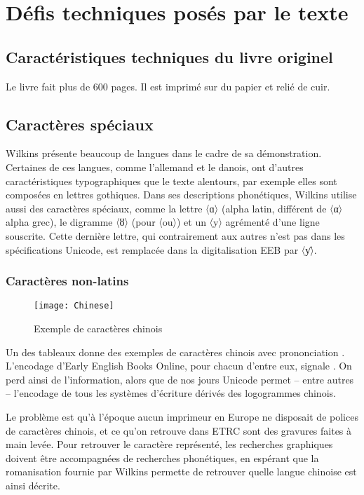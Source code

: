 \chapter{Défis techniques posés par le texte}\label{Défis}
\section{Caractéristiques techniques du livre originel}\label{DéfisTech}
Le livre fait plus de 600 pages.
Il est imprimé sur du papier et relié de cuir.

\section{Caractères spéciaux}\label{DéfisCar}
Wilkins présente beaucoup de langues dans le cadre de sa démonstration.
Certaines de ces langues, comme l'allemand et le danois, ont d'autres caractéristiques typographiques que le texte alentours, par exemple elles sont composées en lettres gothiques.
Dans ses descriptions phonétiques, Wilkins utilise aussi des caractères spéciaux, comme la lettre 〈ɑ〉 (alpha latin, différent de 〈α〉 alpha grec), le digramme 〈ȣ〉 (pour 〈ou〉) et un 〈y〉 agrémenté d'une ligne souscrite.
Cette dernière lettre, qui contrairement aux autres n'est pas dans les spécifications Unicode, est remplacée dans la digitalisation EEB par 〈ƴ〉.
\subsection{Caractères non-latins}
\begin{figure}[h]
   \caption{\label{Chinese} Exemple de caractères chinois}
   \texttt{[image: Chinese]}
\end{figure}
Un des tableaux donne des exemples de caractères chinois avec prononciation \parencite[p. 451]{wilkins_essay_1668}.
L'encodage d'Early English Books Online, pour chacun d'entre eux, signale .
On perd ainsi de l'information, alors que de nos jours Unicode permet -- entre autres -- l'encodage de tous les systèmes d'écriture dérivés des logogrammes chinois.

Le problème est qu'à l'époque aucun imprimeur en Europe ne disposait de polices de caractères chinois, et ce qu'on retrouve dans ETRC sont des gravures faites à main levée.
Pour retrouver le caractère représenté, les recherches graphiques doivent être accompagnées de recherches phonétiques, en espérant que la romanisation fournie par Wilkins permette de retrouver quelle langue chinoise est ainsi décrite.

